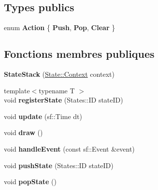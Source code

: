 \subsection*{Types publics}
\begin{DoxyCompactItemize}
\item 
enum {\bfseries Action} \{ {\bfseries Push}, 
{\bfseries Pop}, 
{\bfseries Clear}
 \}\hypertarget{class_state_stack_af804142a55cd477767353e0abbcc218c}{}\label{class_state_stack_af804142a55cd477767353e0abbcc218c}

\end{DoxyCompactItemize}
\subsection*{Fonctions membres publiques}
\begin{DoxyCompactItemize}
\item 
{\bfseries State\+Stack} (\hyperlink{struct_state_1_1_context}{State\+::\+Context} context)\hypertarget{class_state_stack_a365f29afd04a9370f6638cbe3b4ff92a}{}\label{class_state_stack_a365f29afd04a9370f6638cbe3b4ff92a}

\item 
{\footnotesize template$<$typename T $>$ }\\void {\bfseries register\+State} (States\+::\+ID state\+ID)\hypertarget{class_state_stack_a9d64daa479c2cccad6f2ede77741a352}{}\label{class_state_stack_a9d64daa479c2cccad6f2ede77741a352}

\item 
void {\bfseries update} (sf\+::\+Time dt)\hypertarget{class_state_stack_ae90af9f56ce7774d47d0407e2680c27d}{}\label{class_state_stack_ae90af9f56ce7774d47d0407e2680c27d}

\item 
void {\bfseries draw} ()\hypertarget{class_state_stack_a0990b973b2a0bdf8fad2f326e564931a}{}\label{class_state_stack_a0990b973b2a0bdf8fad2f326e564931a}

\item 
void {\bfseries handle\+Event} (const sf\+::\+Event \&event)\hypertarget{class_state_stack_a70d3ffad9da499b8356789115f3e2acf}{}\label{class_state_stack_a70d3ffad9da499b8356789115f3e2acf}

\item 
void {\bfseries push\+State} (States\+::\+ID state\+ID)\hypertarget{class_state_stack_a80ed85f0fc13039e6f4c7dfef19e608f}{}\label{class_state_stack_a80ed85f0fc13039e6f4c7dfef19e608f}

\item 
void {\bfseries pop\+State} ()\hypertarget{class_state_stack_a7e050a57b798295c2344f1318765b5ee}{}\label{class_state_stack_a7e050a57b798295c2344f1318765b5ee}


\end{DoxyCompactItemize}
